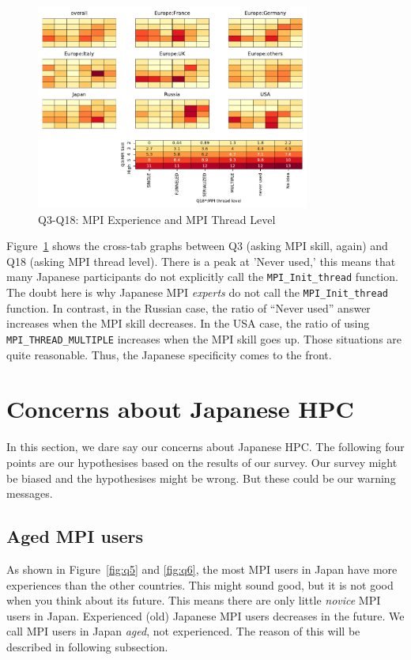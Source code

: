 \documentclass[submit,techrep,noauthor,english]{ipsj}
\begin{document}
\begin{figure}[htb]
\begin{center}
\includegraphics[width=9cm]{../pdfs/Q3-Q18.pdf}
\caption{Q3-Q18: MPI Experience and MPI Thread Level}
\label{fig:q3-q18}
\end{center}
\end{figure}

Figure~\ref{fig:q3-q18} shows the cross-tab graphs between
Q3 (asking MPI skill, again) and Q18 (asking MPI thread
level). There is a peak at 'Never used,' this means that many Japanese
participants do not explicitly call the {\tt MPI\_Init\_thread}
function.  The doubt here is why Japanese MPI {\em experts} do not
call the {\tt MPI\_Init\_thread} function. 
In contrast, in the Russian case, the ratio of ``Never used'' answer
increases when the  MPI skill decreases. In the USA case, the ratio of
using {\tt MPI\_THREAD\_MULTIPLE} increases when the MPI skill goes
up. Those situations are quite reasonable. Thus, the Japanese
specificity comes to the front. 

\section{Concerns about Japanese HPC}

In this section, we dare say our concerns about Japanese HPC. The
following four points are our hypothesises based on the results of our 
survey. Our survey might be biased and the hypothesises might be
wrong. But these could be our warning messages. 

\subsection{Aged MPI users}

As shown in Figure~\ref{fig:q5} and \ref{fig:q6}, the most MPI users
in Japan have more experiences than the other countries. This might
sound good, but it is not good when you think about its future.  This
means there are only little {\em novice} MPI users in Japan.
Experienced (old) Japanese MPI users decreases in the future.  We
call MPI users in Japan {\em aged}, not experienced. The reason of
this will be described in following subsection.
\end{document}
